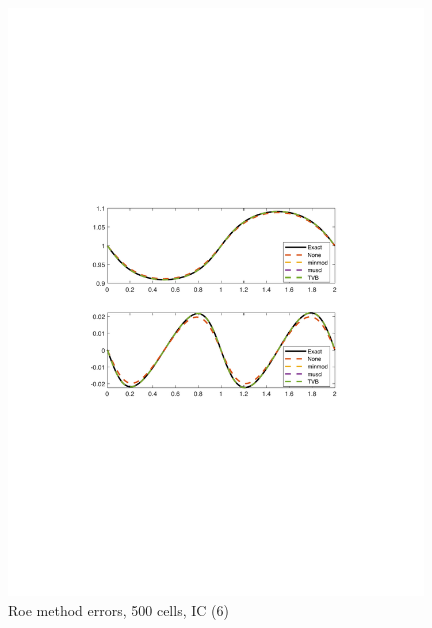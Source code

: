 \documentclass[11pt,a4paper]{article}
\begin{document}
\begin{figure}[!htb]
    \centering
    \includegraphics[width=11cm]{2_2_a_IC_2_Roe.pdf}
    \caption{Roe method errors, 500 cells, IC (6)}
    \label{fig:Roe_IC_2}
\end{figure}
\end{document}
